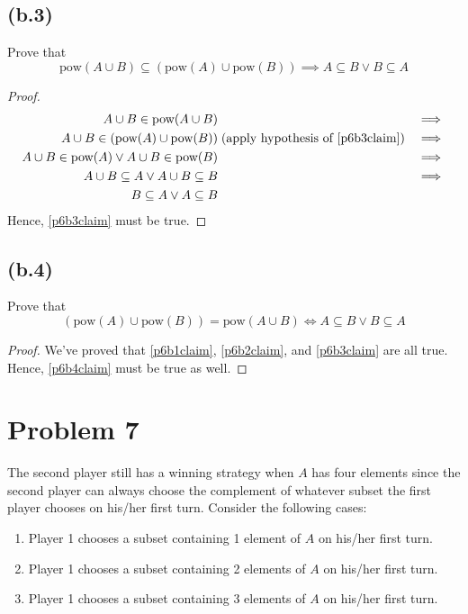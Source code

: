 \documentclass{article}
\begin{document}
\subsection{(b.3)}
Prove that
\begin{equation}\label{p6b3claim}
	\text{pow}(A \cup B) \subseteq (\text{pow}(A) \cup \text{pow}(B)) \implies A \subseteq B \lor B \subseteq A
\end{equation}
\begin{proof}
	\begin{align*}
		A \cup B \in \text{pow}(A \cup B)                          &                                                    & \implies \\
		A \cup B \in (\text{pow}(A) \cup \text{pow}(B))            & \; (\text{apply hypothesis of } \eqref{p6b3claim}) & \implies \\
		A \cup B \in \text{pow}(A) \lor A \cup B \in \text{pow}(B) &                                                    & \implies \\
		A \cup B \subseteq A \lor A \cup B \subseteq B             &                                                    & \implies \\
		B \subseteq A \lor A \subseteq B
	\end{align*}
	Hence, \eqref{p6b3claim} must be true.
\end{proof}


\subsection{(b.4)}
Prove that
\begin{equation}\label{p6b4claim}
	(\text{pow}(A) \cup \text{pow}(B)) = \text{pow}(A \cup B) \iff A \subseteq B \lor B \subseteq A
\end{equation}


\begin{proof}
	We've proved that \eqref{p6b1claim}, \eqref{p6b2claim}, and \eqref{p6b3claim} are all true. Hence, \eqref{p6b4claim} must be true as well.
\end{proof}

\pagebreak

\section{Problem 7}
The second player still has a winning strategy when $A$ has four elements since the second player can always choose the complement of whatever subset the first player chooses on his/her first turn. Consider the following cases:
\begin{enumerate}
	\item Player 1 chooses a subset containing 1 element of $A$ on his/her first turn.
	\item Player 1 chooses a subset containing 2 elements of $A$ on his/her first turn.
	\item Player 1 chooses a subset containing 3 elements of $A$ on his/her first turn.
\end{enumerate}
\end{document}
